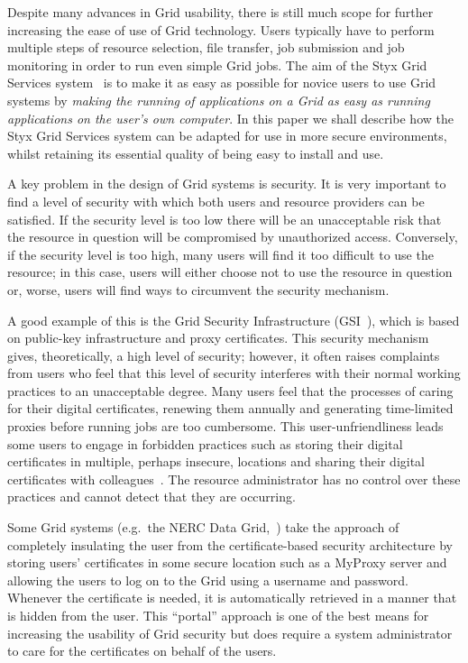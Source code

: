 \documentclass[times,10pt,twocolumn,8.5x11]{article}
\begin{document}
Despite many advances in Grid usability, there is still much scope for further increasing the ease of use of Grid technology.  Users typically have to perform multiple steps of resource selection, file transfer, job submission and job monitoring in order to run even simple Grid jobs.  The aim of the Styx Grid Services system~\cite{blower:2006} is to make it as easy as possible for novice users to use Grid systems by {\em making the running of applications on a Grid as easy as running applications on the user's own computer\/}.  In this paper we shall describe how the Styx Grid Services system can be adapted for use in more secure environments, whilst retaining its essential quality of being easy to install and use.

A key problem in the design of Grid systems is security.  It is very important to find a level of security with which both users and resource providers can be satisfied.  If the security level is too low there will be an unacceptable risk that the resource in question will be compromised by unauthorized access.  Conversely, if the security level is too high, many users will find it too difficult to use the resource; in this case, users will either choose not to use the resource in question or, worse, users will find ways to circumvent the security mechanism.

A good example of this is the Grid Security Infrastructure (GSI~\cite{gsi}), which is based on public-key infrastructure and proxy certificates.  This security mechanism gives, theoretically, a high level of security; however, it often raises complaints from users who feel that this level of security interferes with their normal working practices to an unacceptable degree.  Many users feel that the processes of caring for their digital certificates, renewing them annually and generating time-limited proxies before running jobs are too cumbersome.  This user-unfriendliness leads some users to engage in forbidden practices such as storing their digital certificates in multiple, perhaps insecure, locations and sharing their digital certificates with colleagues~\cite{beckles:2005}.  The resource administrator has no control over these practices and cannot detect that they are occurring.

Some Grid systems (e.g.\ the NERC Data Grid,~\cite{ndg}) take the approach of completely insulating the user from the certificate-based security architecture by storing users' certificates in some secure location such as a MyProxy server and allowing the users to log on to the Grid using a username and password.  Whenever the certificate is needed, it is automatically retrieved in a manner that is hidden from the user.  This ``portal'' approach is one of the best means for increasing the usability of Grid security but does require a system administrator to care for the certificates on behalf of the users.
\end{document}
